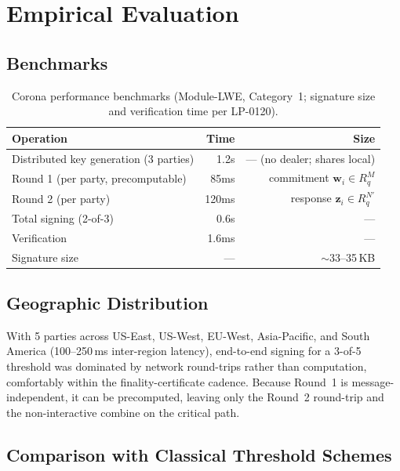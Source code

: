 \section{Empirical Evaluation}

\label{sec:evaluation}

\subsection{Benchmarks}

\begin{table}[h]
\centering
\begin{tabular}{@{}lrr@{}}
\toprule
\textbf{Operation} & \textbf{Time} & \textbf{Size} \\
\midrule
Distributed key generation (3 parties) & 1.2s & --- (no dealer; shares local) \\
Round 1 (per party, precomputable) & 85ms & commitment $\mathbf{w}_i \in R_q^{M}$ \\
Round 2 (per party) & 120ms & response $\mathbf{z}_i \in R_q^{N'}$ \\
Total signing (2-of-3) & 0.6s & --- \\
Verification & 1.6ms & --- \\
Signature size & --- & $\sim$33--35\,KB \\
\bottomrule
\end{tabular}
\caption{Corona performance benchmarks (Module-LWE, Category~1; signature size and
verification time per LP-0120).}
\label{tab:benchmarks}
\end{table}

\subsection{Geographic Distribution}

With 5 parties across US-East, US-West, EU-West, Asia-Pacific, and South America
(100--250\,ms inter-region latency), end-to-end signing for a 3-of-5 threshold was
dominated by network round-trips rather than computation, comfortably within the
finality-certificate cadence. Because Round~1 is message-independent, it can be
precomputed, leaving only the Round~2 round-trip and the non-interactive combine on the
critical path.

\subsection{Comparison with Classical Threshold Schemes}

